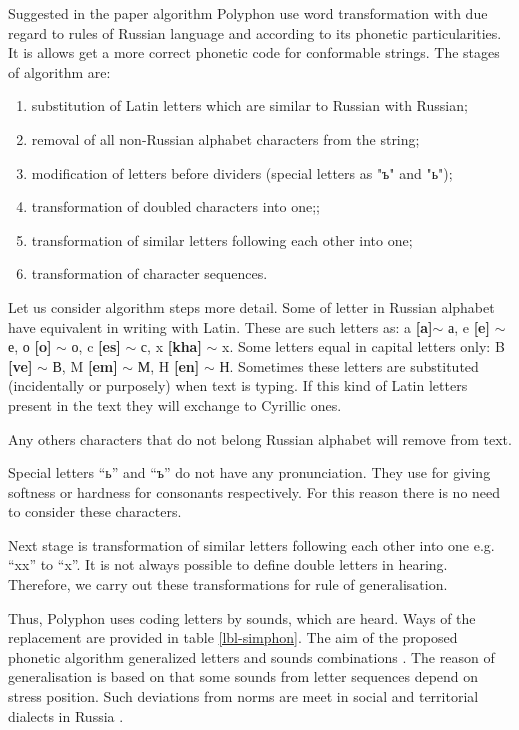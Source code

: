 \documentclass[conference,a4paper]{IEEEtran}
\begin{document}
Suggested in the paper algorithm Polyphon \cite{Paramonov-2016} use word transformation with due regard to rules of Russian language and according to its phonetic particularities. It is allows get a more correct phonetic code for conformable strings. The stages of algorithm are:

\begin{enumerate}
\item substitution of Latin letters which are similar to Russian with Russian;
\item removal of all non-Russian alphabet characters from the string;
\item modification of letters before dividers (special letters as "ъ" and "ь");
\item transformation of doubled characters into one;;
\item transformation of similar letters following each other into one;
\item transformation of character sequences.
\end{enumerate}

Let us consider algorithm steps more detail. Some of letter in Russian alphabet have equivalent in writing with Latin. These are such letters as: a \textbf{[a]}$\sim$ а, e \textbf{[e]} $\sim$ е, о \textbf{[o]} $\sim$ о, c \textbf{[es]} $\sim$ с, x \textbf{[kha]} $\sim$ x. Some letters equal in capital letters only: B \textbf{[ve]} $\sim$ В, M \textbf{[em]} $\sim$ М, H \textbf{[en]} $\sim$ Н. Sometimes these letters are substituted (incidentally or purposely) when text is typing. If this kind of Latin letters present in the text they will exchange to Cyrillic ones. 

Any others characters that do not belong Russian alphabet will remove from text.

Special letters “ь” and “ъ” do not have any pronunciation. They use for giving softness or hardness for consonants respectively. For this reason there is no need to consider these characters.

Next stage is transformation of similar letters following each other into one e.g. “xx” to “x”. It is not always possible to define double letters in hearing. Therefore, we carry out these transformations for rule of generalisation.

Thus, Polyphon uses coding letters by sounds, which are heard. Ways of the replacement are provided in table \ref{lbl-simphon}. The aim of the proposed phonetic algorithm generalized letters and sounds combinations \cite{Ivanova-2005}. The reason of generalisation is based on that some sounds from letter sequences depend on stress position.  Such deviations from norms are meet in social and territorial dialects in Russia \cite{Zhirmunsky-1936}.
\end{document}
